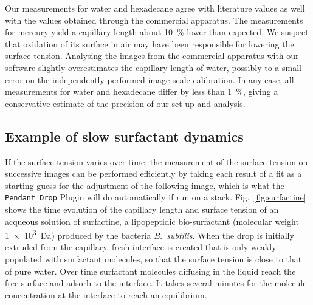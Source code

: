 \documentclass[fleqn]{scrartcl}
\newcommand{\gouttependante}{\texttt{Pendant\_Drop}\xspace}
\begin{document}
Our measurements for water and hexadecane agree with literature values
as well with the values obtained through the commercial apparatus. The
measurements for mercury yield a capillary length about
\SI{10}{\percent} lower than expected. We suspect that oxidation of
its surface in air may have been responsible for lowering the surface
tension. Analysing the images from the commercial apparatus with our
software slightly overestimates the capillary length of water,
possibly to a small error on the independently performed image scale
calibration. In any case, all measurements for water and hexadecane
differ by less than \SI{1}{\percent}, giving a conservative estimate
of the precision of our set-up and analysis.

\subsection{Example of slow surfactant dynamics}

If the surface tension varies over time, the measurement of the
surface tension on successive images can be performed efficiently by
taking each result of a fit as a starting guess for the adjustment of
the following image, which is what the \gouttependante Plugin will do
automatically if run on a stack. Fig.~\ref{fig:surfactine} shows the
time evolution of the capillary length and surface tension of an
acqueous solution of surfactine, a lipopeptidic bio-surfactant
(molecular weight \SI{1e3}{\dalton}) produced by the bacteria
\textit{B.~subtilis}. When the drop is initially extruded from the
capillary, fresh interface is created that is only weakly populated
with surfactant molecules, so that the surface tension is close to
that of pure water. Over time surfactant molecules diffusing in the
liquid reach the free surface and adsorb to the interface. It takes
several minutes for the molecule concentration at the interface to
reach an equilibrium.
\end{document}
